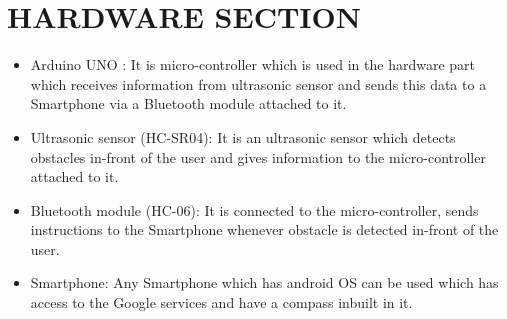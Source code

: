 \documentclass[11pt,a4paper]{report}
\begin{document}
\section{HARDWARE SECTION}
\begin{itemize}
\item Arduino UNO : It is micro-controller which is used in the hardware part which
receives information from ultrasonic sensor and sends this data to a Smartphone
via a Bluetooth module attached to it.
\item Ultrasonic sensor (HC-SR04): It is an ultrasonic sensor which detects obstacles
in-front of the user and gives information to the micro-controller attached to it.
\item Bluetooth module (HC-06): It is connected to the micro-controller, sends instructions
to the Smartphone whenever obstacle is detected in-front of the user.
\item Smartphone: Any Smartphone which has android OS can be used which has access
to the Google services and have a compass inbuilt in it.
\end{itemize}
\end{document}
